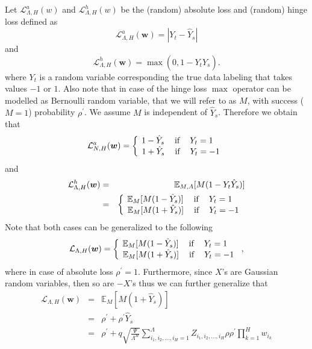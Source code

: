 \documentclass[twoside]{article}
\begin{document}
Let $\mathcal{L}^a_{\Lambda,H}(w)$ and $\mathcal{L}^h_{\Lambda,H}(w)$ be the (random) absolute loss and (random) hinge loss defined as
\[\mathcal{L}^a_{\Lambda,H}({\bm w}) = |Y_t - \hat{Y}_s|
\]
and
\[\mathcal{L}^h_{\Lambda,H}({\bm w}) = \max(0,1-Y_t\hat{Y}_s).
\]
where $Y_t$ is a random variable corresponding the true data labeling that takes values $-1$ or $1$. Also note that in case of the hinge loss $\max$ operator can be modelled as Bernoulli random variable, that we will refer to as $M$, with success ($M = 1$) probability $\rho^{'}$. We assume $M$ is independent of $\hat{Y}_s$. Therefore we obtain that
\[\mathcal{L}^a_{N,H}({\bm w}) = \left \{
  \begin{tabular}{c}
  $\!\!\!\!\!\!1 - \hat{Y}_s$ $\:\:\:\:$if$\:\:\:\:$ $Y_t = 1$ \\
  $\!1 + \hat{Y}_s$ $\:\:\:\:$if$\:\:\:\:$ $Y_t = -1$ \\
  \end{tabular}
\right.
\]
and
\begin{eqnarray*}
\mathcal{L}^h_{\Lambda,H}({\bm w}) &=& \mathbb{E}_{M,A}[M(1-Y_t\hat{Y}_s)]\\&=& \left \{
  \begin{tabular}{c}
  $\!\!\!\!\!\!\mathbb{E}_{M}[M(1 - \hat{Y}_s)]$ $\:\:\:\:$if$\:\:\:\:$ $Y_t = 1$ \\
  $\!\mathbb{E}_{M}[M(1 + \hat{Y}_s)]$ $\:\:\:\:$if$\:\:\:\:$ $Y_t = -1$ \\
  \end{tabular}
\right.
\end{eqnarray*}
Note that both cases can be generalized to the following
\[\mathcal{L}_{\Lambda,H}({\bm w}) = \left \{
  \begin{tabular}{c}
  $\!\!\!\!\!\!\mathbb{E}_{M}[M(1 - \hat{Y}_s)]$ $\:\:\:\:$if$\:\:\:\:$ $Y_t = 1$ \\
  $\!\mathbb{E}_{M}[M(1 + \hat{Y}_s)]$ $\:\:\:\:$if$\:\:\:\:$ $Y_t = -1$ \\
  \end{tabular}
\right.,
\]
where in case of absolute loss $\rho^{'} = 1$. Furthermore, since $X$'s are Gaussian random variables, then so are $-X$'s thus we can further generalize that
\begin{eqnarray*}
\mathcal{L}_{\Lambda,H}({\bm w}) \!\!\!\!\!&=&\!\!\!\!\! \mathbb{E}_{M}[M(1 + \hat{Y}_s)]\\
&=& \!\!\!\!\!\rho^{'} + \rho^{'}\hat{Y}_s\\
&=& \!\!\!\!\!\rho^{'} + q\sqrt{\!\!\frac{\Psi}{\Lambda^H}\!\!}\sum_{i_1,i_2,\dots,i_H=1}^{\Lambda}\!\!Z_{i_1,i_2,\dots,i_H}\rho\rho^{'}\prod_{k = 1}^{H}w_{i_k}
\end{eqnarray*}
\end{document}
